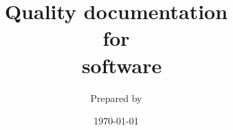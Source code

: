 
\def\Company{National Physical Laboratory}

\def\BoldTitle{Quality documentation}

\def\Subtitle{for \\ \packagename\ software \\}
\def\Authors{Prepared by \authorname} 
\def\Shortname{\authorname}


\title{\textbf{\BoldTitle}\\\Subtitle}
\author{\Authors}
\date{\today}

